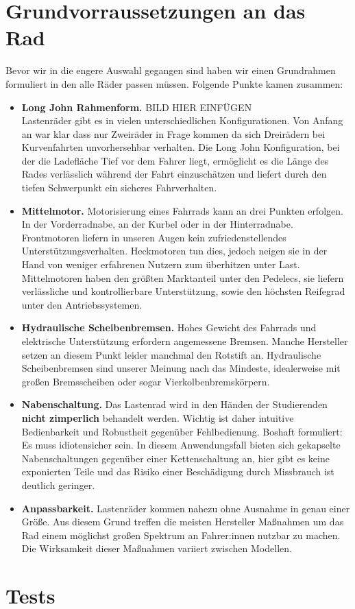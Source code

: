 \documentclass[a4paper,ngerman, 14pt] {scrartcl}
\begin{document}
\section{Grundvorraussetzungen an das Rad}
Bevor wir in die engere Auswahl gegangen sind haben wir einen Grundrahmen formuliert in den alle Räder passen müssen. Folgende Punkte kamen zusammen:\\
\begin{itemize}
    \item \textbf{Long John Rahmenform.} BILD HIER EINFÜGEN\\ Lastenräder gibt es in vielen unterschiedlichen Konfigurationen. Von Anfang an war klar dass nur Zweiräder in Frage kommen da sich Dreirädern bei Kurvenfahrten unvorhersehbar verhalten. Die Long John Konfiguration, bei der die Ladefläche Tief vor dem Fahrer liegt, ermöglicht es die Länge des Rades verlässlich während der Fahrt einzuschätzen und liefert durch den tiefen Schwerpunkt ein sicheres Fahrverhalten.
    \item \textbf{Mittelmotor.} Motorisierung eines Fahrrads kann an drei Punkten erfolgen. In der Vorderradnabe, an der Kurbel oder in der Hinterradnabe. Frontmotoren liefern in unseren Augen kein zufriedenstellendes Unterstützungsverhalten. Heckmotoren tun dies, jedoch neigen sie in der Hand von weniger erfahrenen Nutzern zum überhitzen unter Last. Mittelmotoren haben den größten Marktanteil unter den Pedelecs, sie liefern verlässliche und kontrollierbare Unterstützung, sowie den höchsten Reifegrad unter den Antriebssystemen.
    \item \textbf{Hydraulische Scheibenbremsen.} Hohes Gewicht des Fahrrads und elektrische Unterstützung erfordern angemessene Bremsen. Manche Hersteller setzen an diesem Punkt leider manchmal den Rotstift an. Hydraulische Scheibenbremsen sind unserer Meinung nach das Mindeste, idealerweise mit großen Bremsscheiben oder sogar Vierkolbenbremskörpern.
    \item \textbf{Nabenschaltung.} Das Lastenrad wird in den Händen der Studierenden \textbf{nicht zimperlich} behandelt werden. Wichtig ist daher intuitive Bedienbarkeit und Robustheit gegenüber Fehlbedienung. Boshaft formuliert: Es muss idiotensicher sein. In diesem Anwendungsfall bieten sich gekapselte Nabenschaltungen gegenüber einer Kettenschaltung an, hier gibt es keine exponierten Teile und das Risiko einer Beschädigung durch Missbrauch ist deutlich geringer.
    \item \textbf{Anpassbarkeit.} Lastenräder kommen nahezu ohne Ausnahme in genau einer Größe. Aus diesem Grund treffen die meisten Hersteller Maßnahmen um das Rad einem möglichst großen Spektrum an Fahrer:innen nutzbar zu machen. Die Wirksamkeit dieser Maßnahmen variiert zwischen Modellen.
\end{itemize}
\section{Tests}
\end{document}

